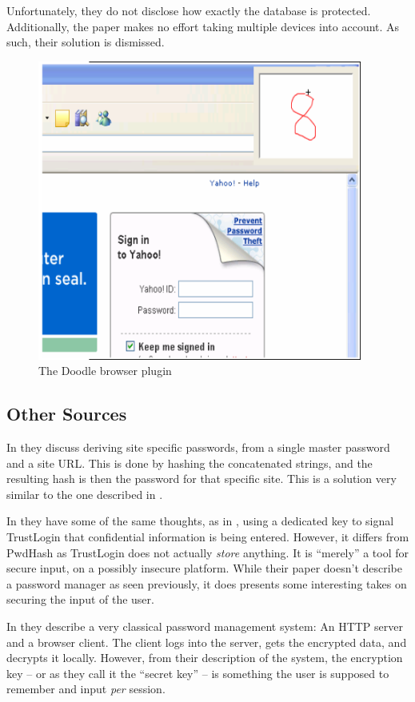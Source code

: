 			Unfortunately, they do not disclose how exactly the database is protected. Additionally, the paper makes no effort taking multiple devices into account. As such, their solution is dismissed.

			\begin{figure}[htbp]
				\centering
				\includegraphics[width=0.95\textwidth]{figures/analysis/doodle.png}
				\caption{The Doodle browser plugin}
				\label{fig:doodle}
			\end{figure}

		\subsection*{Other Sources}
			In \cite{halderman2005} they discuss deriving site specific passwords, from a single master password and a site URL. This is done by hashing the concatenated strings, and the resulting hash is then the password for that specific site. This is a solution very similar to the one described in \cite{pwdhash}.

			In \cite{zhang2015} they have some of the same thoughts, as in \cite{pwdhash}, using a dedicated key to signal TrustLogin that confidential information is being entered. However, it differs from PwdHash as TrustLogin does not actually \emph{store} anything. It is ``merely'' a tool for secure input, on a possibly insecure platform. While their paper doesn't describe a password manager as seen previously, it does presents some interesting takes on securing the input of the user.

			In \cite{englert2009} they describe a very classical password management system: An HTTP server and a browser client. The client logs into the server, gets the encrypted data, and decrypts it locally. However, from their description of the system, the encryption key -- or as they call it the ``secret key'' -- is something the user is supposed to remember and input \emph{per} session. 